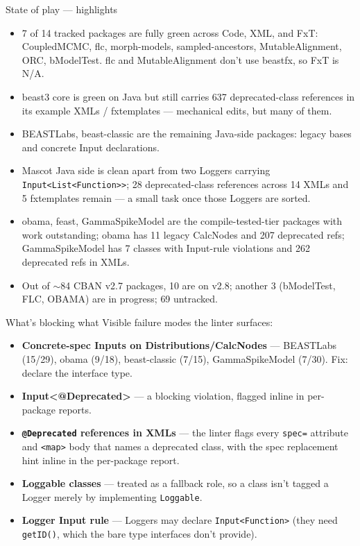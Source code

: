 \documentclass[aspectratio=169]{beamer}
\begin{document}
\begin{frame}{State of play --- highlights}
  \begin{itemize}
    \item \alert{7 of 14} tracked packages are fully green across Code, XML, and FxT: CoupledMCMC, flc, morph-models, sampled-ancestors, MutableAlignment, ORC, bModelTest. flc and MutableAlignment don't use beastfx, so FxT is N/A.
    \item \alert{beast3 core} is green on Java but still carries 637 deprecated-class references in its example XMLs / fxtemplates --- mechanical edits, but many of them.
    \item \alert{BEASTLabs, beast-classic} are the remaining Java-side packages: legacy bases and concrete Input declarations.
    \item \alert{Mascot} Java side is clean apart from two Loggers carrying \texttt{Input<List<Function>>}; 28 deprecated-class references across 14 XMLs and 5 fxtemplates remain --- a small task once those Loggers are sorted.
    \item \alert{obama, feast, GammaSpikeModel} are the compile-tested-tier packages with work outstanding; obama has 11 legacy CalcNodes and 207 deprecated refs; GammaSpikeModel has 7 classes with Input-rule violations and 262 deprecated refs in XMLs.
    \item Out of $\sim$84 CBAN v2.7 packages, \alert{10} are on v2.8; another \alert{3} (bModelTest, FLC, OBAMA) are in progress; \alert{69} untracked.
  \end{itemize}
\end{frame}

\begin{frame}{What's blocking what}
  Visible failure modes the linter surfaces:
  \begin{itemize}
    \item \textbf{Concrete-spec Inputs on Distributions/CalcNodes} --- BEASTLabs (15/29), obama (9/18), beast-classic (7/15), GammaSpikeModel (7/30). Fix: declare the interface type.
    \item \textbf{Input<@Deprecated>} --- a blocking violation, flagged inline in per-package reports.
    \item \textbf{\texttt{@Deprecated} references in XMLs} --- the linter flags every \texttt{spec=} attribute and \texttt{<map>} body that names a deprecated class, with the spec replacement hint inline in the per-package report.
    \item \textbf{Loggable classes} --- treated as a fallback role, so a class isn't tagged a Logger merely by implementing \texttt{Loggable}.
    \item \textbf{Logger Input rule} --- Loggers may declare \texttt{Input<Function>} (they need \texttt{getID()}, which the bare type interfaces don't provide).
  \end{itemize}
\end{frame}
\end{document}
